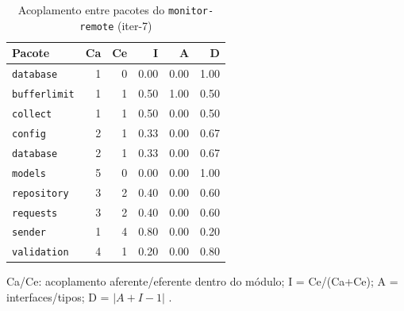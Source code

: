 \begin{table}[htbp]
  \centering\small
  \caption{Acoplamento entre pacotes do \texttt{monitor-remote} (iter-7)}
  \label{tab:iter-7-acoplamento-remote}
  \begin{tabular}{lrrrrr}
    \toprule
    Pacote & Ca & Ce & I & A & D \\
    \midrule
    \texttt{database} & 1 & 0 & 0.00 & 0.00 & 1.00 \\
    \texttt{bufferlimit} & 1 & 1 & 0.50 & 1.00 & 0.50 \\
    \texttt{collect} & 1 & 1 & 0.50 & 0.00 & 0.50 \\
    \texttt{config} & 2 & 1 & 0.33 & 0.00 & 0.67 \\
    \texttt{database} & 2 & 1 & 0.33 & 0.00 & 0.67 \\
    \texttt{models} & 5 & 0 & 0.00 & 0.00 & 1.00 \\
    \texttt{repository} & 3 & 2 & 0.40 & 0.00 & 0.60 \\
    \texttt{requests} & 3 & 2 & 0.40 & 0.00 & 0.60 \\
    \texttt{sender} & 1 & 4 & 0.80 & 0.00 & 0.20 \\
    \texttt{validation} & 4 & 1 & 0.20 & 0.00 & 0.80 \\
    \bottomrule
  \end{tabular}
  \par\smallskip\footnotesize Ca/Ce: acoplamento aferente/eferente dentro do módulo; I = Ce/(Ca+Ce); A = interfaces/tipos; D = $|A+I-1|$ \cite{martin2002}.
\end{table}

